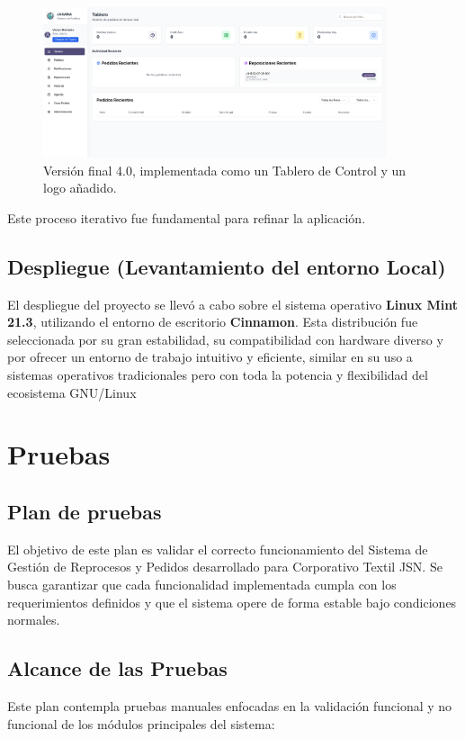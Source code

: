\documentclass[12pt,letterpaper,spanish]{report}
\begin{document}
\begin{figure}[H]
    \centering
    \includegraphics[width=0.9\textwidth]{V4.0.png}
    \caption{Versión final 4.0, implementada como un Tablero de Control y un logo añadido.}
    \label{fig:v4}
\end{figure}

Este proceso iterativo fue fundamental para refinar la aplicación.

\subsection{Despliegue (Levantamiento del entorno Local)}
El despliegue del proyecto se llevó a cabo sobre el sistema operativo \textbf{Linux Mint 21.3}, utilizando el entorno de escritorio \textbf{Cinnamon}. Esta distribución fue seleccionada por su gran estabilidad, su compatibilidad con hardware diverso y por ofrecer un entorno de trabajo intuitivo y eficiente, similar en su uso a sistemas operativos tradicionales pero con toda la potencia y flexibilidad del ecosistema GNU/Linux



\section{Pruebas}

\subsection{Plan de pruebas}
El objetivo de este plan es validar el correcto funcionamiento del Sistema de Gesti\'on de Reprocesos y Pedidos desarrollado para Corporativo Textil JSN. Se busca garantizar que cada funcionalidad implementada cumpla con los requerimientos definidos y que el sistema opere de forma estable bajo condiciones normales.

\subsection{Alcance de las Pruebas}
Este plan contempla pruebas manuales enfocadas en la validaci\'on funcional y no funcional de los m\'odulos principales del sistema:
\end{document}
